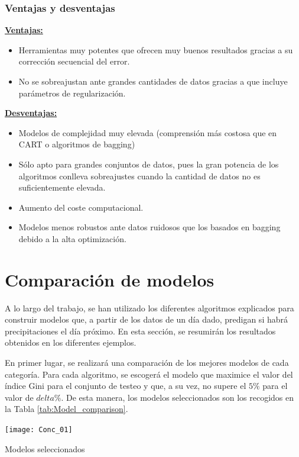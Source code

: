 \documentclass[12pt,twoside]{article}
\begin{document}
\subsubsection{Ventajas y desventajas}

\textbf{\underline{Ventajas:}}
\begin{itemize}
\item Herramientas muy potentes que ofrecen muy buenos resultados gracias a su corrección secuencial del error.

\item No se sobreajustan ante grandes cantidades de datos gracias a que incluye parámetros de regularización.
\end{itemize}

\newpage
\textbf{\underline{Desventajas:}}
\begin{itemize}
\item Modelos de complejidad muy elevada (comprensión más costosa que en CART o algoritmos de bagging)

\item Sólo apto para grandes conjuntos de datos, pues la gran potencia de los algoritmos conlleva sobreajustes cuando la cantidad de datos no es suficientemente elevada.

\item Aumento del coste computacional.

\item Modelos menos robustos ante datos ruidosos que los basados en bagging debido a la alta optimización.
\end{itemize}





\newpage
\section{Comparación de modelos}

A lo largo del trabajo, se han utilizado los diferentes algoritmos explicados para construir modelos que, a partir de los datos de un día dado, predigan si habrá precipitaciones el día próximo. En esta sección, se resumirán los resultados obtenidos en los diferentes ejemplos.

En primer lugar, se realizará una comparación de los mejores modelos de cada categoría. Para cada algoritmo, se escogerá el modelo que maximice el valor del índice Gini para el conjunto de testeo y que, a su vez, no supere el $5\%$ para el valor de $delta\%$. De esta manera, los modelos seleccionados son  los recogidos en la Tabla \ref{tab:Model_comparison}.
\begin{table}[h]
\centering
\texttt{[image: Conc\_01]}
\caption{Modelos seleccionados}
\label{tab:Model_comparison}
\end{table}
\end{document}

